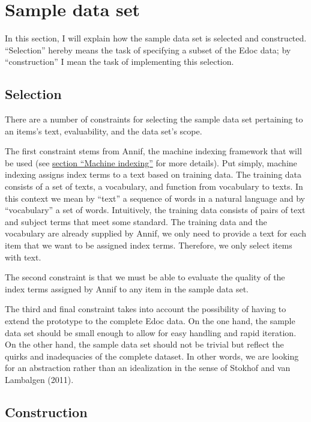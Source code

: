 \hypertarget{sample-data-set}{%
\section{Sample data set}\label{sample-data-set}}

In this section, I will explain how the sample data set is selected and
constructed. ``Selection'' hereby means the task of specifying a subset
of the Edoc data; by ``construction'' I mean the task of implementing
this selection.

\hypertarget{selection}{%
\subsection{Selection}\label{selection}}

There are a number of constraints for selecting the sample data set
pertaining to an items's text, evaluability, and the data set's scope.

The first constraint stems from Annif, the machine indexing framework
that will be used (see \protect\hyperlink{machine-indexing}{section
``Machine indexing''} for more details). Put simply, machine indexing
assigns index terms to a text based on training data. The training data
consists of a set of texts, a vocabulary, and function from vocabulary
to texts. In this context we mean by ``text'' a sequence of words in a
natural language and by ``vocabulary'' a set of words. Intuitively, the
training data consists of pairs of text and subject terms that meet some
standard. The training data and the vocabulary are already supplied by
Annif, we only need to provide a text for each item that we want to be
assigned index terms. Therefore, we only select items with text.

The second constraint is that we must be able to evaluate the quality of
the index terms assigned by Annif to any item in the sample data set.

The third and final constraint takes into account the possibility of
having to extend the prototype to the complete Edoc data. On the one
hand, the sample data set should be small enough to allow for easy
handling and rapid iteration. On the other hand, the sample data set
should not be trivial but reflect the quirks and inadequacies of the
complete dataset. In other words, we are looking for an abstraction
rather than an idealization in the sense of Stokhof and van Lambalgen
(2011).

\hypertarget{construction}{%
\subsection{Construction}\label{construction}}

